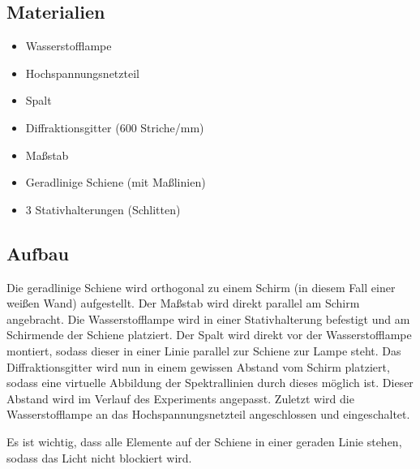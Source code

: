 \documentclass[12pt, a4paper]{article}
\begin{document}
\subsection{Materialien}

\begin{itemize}
    \item Wasserstofflampe
    \item Hochspannungsnetzteil
    \item Spalt
    \item Diffraktionsgitter (600 Striche/mm)
    \item Maßstab
    \item Geradlinige Schiene (mit Maßlinien)
    \item 3 Stativhalterungen (Schlitten)
\end{itemize}

\newpage

\subsection{Aufbau}
Die geradlinige Schiene wird orthogonal zu einem Schirm (in diesem Fall einer weißen Wand) aufgestellt.
Der Maßstab wird direkt parallel am Schirm angebracht.
Die Wasserstofflampe wird in einer Stativhalterung befestigt und am Schirmende der Schiene platziert.
Der Spalt wird direkt vor der Wasserstofflampe montiert, sodass dieser in einer Linie parallel zur Schiene zur Lampe steht.
Das Diffraktionsgitter wird nun in einem gewissen Abstand vom Schirm platziert, sodass eine virtuelle Abbildung der Spektrallinien durch dieses möglich ist.
Dieser Abstand wird im Verlauf des Experiments angepasst.
Zuletzt wird die Wasserstofflampe an das Hochspannungsnetzteil angeschlossen und eingeschaltet.

Es ist wichtig, dass alle Elemente auf der Schiene in einer geraden Linie stehen, sodass das Licht nicht blockiert wird.
\end{document}
